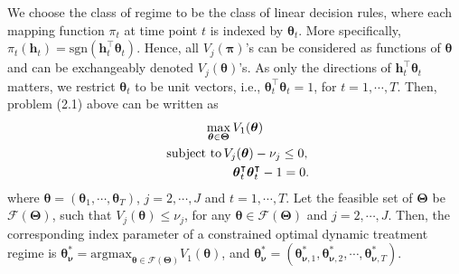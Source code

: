 \documentclass{article}
\newcommand{\itl}{\intercal}
\newcommand{\bs}{ \boldsymbol}
\newcommand{\ml}{\mathcal}
\newcommand{\txt}{\text}
\newcommand{\tsgn}{\txt{sgn}}
\begin{document}
We choose the class of regime to be the class of linear decision rules, where each mapping function $\pi_t$ at time point $t$ is indexed by $\bs{\theta}_t$. More specifically, $\pi_t(\bs{h}_t) = \tsgn(\bs{h}^{\itl}_t\bs{\theta}_t)$. Hence, all $V_j(\bs{\pi})$'s can be considered as functions of $\bs{\theta}$ and can be exchangeably denoted $V_j(\bs{\theta})$'s. As only the directions of $\bs{h}^\itl_t\bs{\theta}_t$ matters, we restrict $\bs{\theta}_t$ to be unit vectors, i.e., $\bs{\theta}^\itl_t\bs{\theta}_t = 1$, for $t = 1, \cdots, T$. Then, problem (2.1) above can be written as
\begin{equation}
\begin{gathered}
\max_{\bs{\theta} \in \bs{\Theta}} V_1(\bs{\theta})\\
\,\, \txt{subject to}\,
V_j(\bs{\theta}) - \nu_j \le 0,\\
\hspace{2.0cm} \bs{\theta}_t^\itl \bs{\theta}_t^\itl - 1 =0.
\end{gathered}
 \end{equation}
where $\bs{\theta} = (\bs{\theta}_1, \cdots, \bs{\theta}_T)$, $j =2, \cdots, J$ and $t = 1, \cdots, T$. Let the feasible set of $\bs{\Theta}$ be $\ml{F}(\bs{\Theta})$, such that $V_j(\bs{\theta}) \le \nu_j$,  for any $\bs{\theta} \in \ml{F}(\bs{\Theta})$ and $j = 2, \cdots, J$. Then, the corresponding index parameter of a constrained optimal dynamic treatment regime is $\bs{\theta}^*_{\bs{\nu}} =\text{argmax}_{\bs{\theta} \in \ml{F}(\bs{\Theta})}V_1(\bs{\theta})$, and $\bs{\theta}^*_{\bs{\nu}} = (\bs{\theta}^*_{\bs{\nu},1}, \bs{\theta}^*_{\bs{\nu},2}, \cdots, \bs{\theta}^*_{\bs{\nu},T})$.
\end{document}
